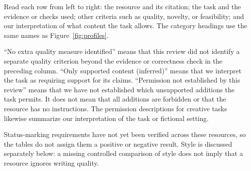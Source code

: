 Read each row from left to right: the resource and its citation; the task
and the evidence or checks used; other criteria such as quality, novelty,
or feasibility; and our interpretation of what content the task allows.
The category headings use the same names as Figure~\ref{fig:profiles}.

``No extra quality measure identified'' means that this review did not
identify a separate quality criterion beyond the evidence or correctness
check in the preceding column. ``Only supported content (inferred)'' means
that we interpret the task as requiring support for its claims.
``Permission not established by this review'' means that we have not
established which unsupported additions the task permits. It does not
mean that all additions are forbidden or that the resource has no instructions.
The permission descriptions for creative tasks likewise summarize our
interpretation of the task or fictional setting.

Status-marking requirements have not yet been verified across these
resources, so the tables do not assign them a positive or negative result.
Style is discussed separately below: a missing controlled comparison of
style does not imply that a resource ignores writing quality.

